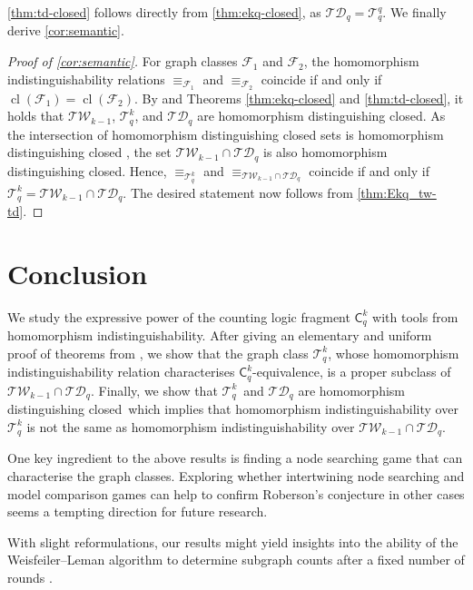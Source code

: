 \documentclass{lmcs}
\theoremstyle{plain}\newtheorem{claim}[thm]{Claim}   %
\newcommand{\cT}{\ensuremath{\mathcal T}}
\newcommand	{\homDistCl}		{homomorphism distinguishing closed}
\newcommand{\TW}{\ensuremath{\mathcal{TW}}}
\newcommand{\TD}{\ensuremath{\mathcal{TD}}}
\newcommand{\Ekq}{\ensuremath{\cT_{q}^{k}}}
\newcommand{\EParam}[2]{\ensuremath{\cT_{#2}^{#1}}}
\DeclareMathOperator{\cl}{cl}
\begin{document}
\autoref{thm:td-closed} follows directly from \autoref{thm:ekq-closed}, as $\TD_q=\EParam{q}{q}$.
We finally derive \autoref{cor:semantic}.

\begin{proof}[Proof of \autoref{cor:semantic}]
	For graph classes $\mathcal{F}_1$ and $\mathcal{F}_2$,
	the homomorphism indistinguishability relations $\equiv_{\mathcal{F}_1}$ and $\equiv_{\mathcal{F}_2}$ coincide
	if and only if $\cl(\mathcal{F}_1) = \cl(\mathcal{F}_2)$.
	By \cite{neuen_homomorphism-distinguishing_2023} and Theorems \ref{thm:ekq-closed} and \ref{thm:td-closed}, it holds that
	$\mathcal{TW}_{k-1}$, $\Ekq$, and $\mathcal{TD}_q$ are homomorphism distinguishing closed.
	As the intersection of homomorphism distinguishing closed sets is homomorphism distinguishing closed 
	\cite[Lemma~6.1]{roberson_oddomorphisms_2022},
	the set $\mathcal{TW}_{k-1} \cap \mathcal{TD}_q$ is also homomorphism distinguishing closed.
	Hence, $\equiv_{\Ekq}$ and  $\equiv_{\mathcal{TW}_{k-1} \cap \mathcal{TD}_q}$
	coincide if and only if $\Ekq = \mathcal{TW}_{k-1} \cap \mathcal{TD}_q$.
	The desired statement now follows from \autoref{thm:Ekq_tw-td}.
\end{proof}

\section{Conclusion}
\label{sec:deep-wide-conclusion}

We study the expressive power of the counting logic fragment $\mathsf{C}^k_q$ with tools from homomorphism indistinguishability.
After giving an elementary and uniform proof of theorems from \cite{dawar_lovasz-type_2021, Dvorak_recognizing_2010, Grohe_counting_2020}, we show that the graph class $\Ekq$, whose homomorphism indistinguishability relation characterises $\mathsf{C}^k_q$-equivalence, is a proper subclass of $\TW_{k-1} \cap \TD_q$.
Finally, we show that \Ekq\ and $\TD_q$ are \homDistCl\ which implies that homomorphism indistinguishability over $\Ekq$ is not the same as homomorphism indistinguishability over $\TW_{k-1} \cap \TD_q$.

One key ingredient to the above results is finding a node searching game that can characterise the graph classes.
Exploring whether intertwining node searching and model comparison games can help to confirm Roberson's conjecture in other cases seems a tempting direction for future research.

With slight reformulations, our results might yield insights into the ability of the Weisfeiler--Leman algorithm to determine subgraph counts after a fixed number of rounds \cite{neuen_homomorphism-distinguishing_2023,rattan_weisfeiler-leman_2023}.
\end{document}
